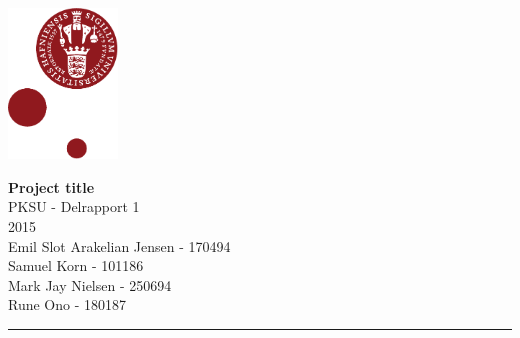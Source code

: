 \documentclass[12pt]{article}
\begin{document}
\begin{minipage}[b]{1.0\linewidth} 
\includegraphics[height=40mm]{KULogo}

\vspace*{-30ex}
\begin{center}
    {\Large \bf Project title} \vspace*{1ex} \\
    {\large PKSU - Delrapport 1} \vspace*{1ex} \\
    {\large 2015} \vspace*{1ex} \\
    {\large Emil Slot Arakelian Jensen - 170494} \vspace*{1ex}\\
    {\large Samuel Korn - 101186} \vspace*{1ex}\\
    {\large Mark Jay Nielsen - 250694} \vspace*{1ex}\\
    {\large Rune Ono - 180187} \vspace*{1ex}\\
\end{center}

\vspace*{-3pt}
{\color{KU-red}\hrule}
\end{minipage}

\newpage
\tableofcontents

\newpage
\end{document}
